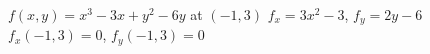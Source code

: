 {$f(x,y) = x^3-3x+y^2-6y$ at $(-1,3)$
}
{$f_x=3x^2-3$, $f_y=2y-6$\\
$f_x(-1,3) = 0$, $f_y(-1,3) = 0$
}